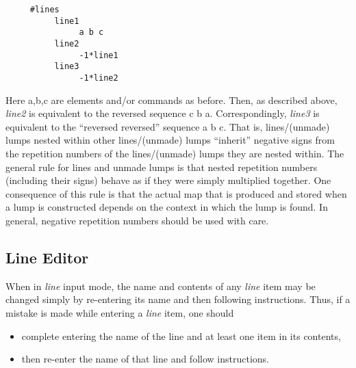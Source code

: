 \begin{footnotesize}
\begin{verbatim}
     #lines
          line1
               a b c
          line2
               -1*line1
          line3
               -1*line2
\end{verbatim}
\end{footnotesize} Here a,b,c are elements and/or commands as before. Then,
as described above, {\em line2} is equivalent to the reversed sequence c b
a. Correspondingly, {\em line3} is equivalent to the ``reversed reversed''
sequence a b c. That is, lines/(unmade) lumps nested within other
lines/(unmade) lumps ``inherit'' negative signs from the repetition numbers
of the lines/(unmade) lumps they are nested within. The general rule for
lines and unmade lumps is that nested repetition numbers (including their
signs) behave as if they were simply multiplied together. One consequence
of this rule is that the actual map that is produced and stored when a lump
is constructed depends on the context in which the lump is found. In
general, negative repetition numbers should be used with care.

\subsection{Line Editor} When in {\em line} input mode, the name and
contents of any {\em line} item may be changed simply by re-entering its
name and then following instructions. Thus, if a mistake is made while
entering a {\em line} item, one should
\begin{itemize} \item complete entering the name of the line and at least
one item in its contents, \item then re-enter the name of that line and
follow instructions.
\end{itemize}

